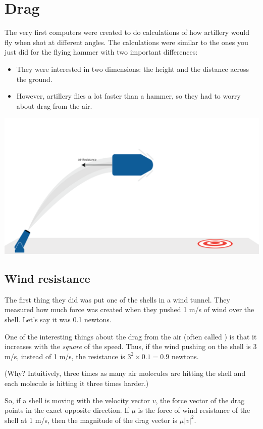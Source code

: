 \chapter{Drag}

The very first computers were created to do calculations of how
artillery would fly when shot at different angles. The calculations
were similar to the ones you just did for the flying
hammer with two important differences:
\begin{itemize}
\item They were interested in two dimensions: the height and the distance across the ground.
\item However, artillery flies a lot faster than a hammer, so they had to worry about drag from the air.
\end{itemize}
\includegraphics[width=1\textwidth]{cannon.png}
\section{Wind resistance}

The first thing they did was put one of the shells in a wind tunnel.
They measured how much force was created when they pushed 1 m/s of
wind over the shell. Let's say it was 0.1 newtons.

One of the interesting things about the drag from the air (often
called ) is that it increases with the
\emph{square} of the speed. Thus, if the wind pushing on the shell is
3 m/s, instead of 1 m/s, the resistance is $3^2 \times 0.1 = 0.9$
newtons.

(Why? Intuitively, three times as many air molecules are hitting the
shell and each molecule is hitting it three times harder.)

So, if a shell is moving with the velocity vector $v$, the force
vector of the drag points in the exact opposite direction. If $\mu$ is
the force of wind resistance of the shell at 1 m/s, then the magnitude
of the drag vector is $\mu |v|^2$.

